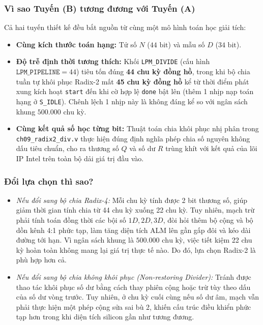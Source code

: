 \subsubsection*{Vì sao Tuyến (B) tương đương với Tuyến (A)}
Cả hai tuyến thiết kế đều bắt nguồn từ cùng một mô hình toán học giải tích:
\begin{itemize}[leftmargin=1.5em, itemsep=2pt]
    \item \textbf{Cùng kích thước toán hạng:} Tử số $N$ ($44\text{ bit}$) và mẫu số $D$ ($34\text{ bit}$).
    \item \textbf{Độ trễ định thời tương thích:} Khối \texttt{LPM\_DIVIDE} (cấu hình $\texttt{LPM\_PIPELINE} = 44$) tiêu tốn đúng \textbf{44 chu kỳ đồng hồ}, trong khi bộ chia tuần tự khôi phục Radix-2 mất \textbf{45 chu kỳ đồng hồ} kể từ thời điểm phát xung kích hoạt \texttt{start} đến khi cờ hợp lệ \texttt{done} bật lên (thêm 1 nhịp nạp toán hạng ở \texttt{S\_IDLE}). Chênh lệch 1 nhịp này là không đáng kể so với ngân sách khung $500.000\text{ chu kỳ}$.
    \item \textbf{Cùng kết quả số học từng bit:} Thuật toán chia khôi phục nhị phân trong \texttt{ch09\_radix2\_div.v} thực hiện đúng định nghĩa phép chia số nguyên không dấu tiêu chuẩn, cho ra thương số $Q$ và số dư $R$ trùng khít với kết quả của lõi IP Intel trên toàn bộ dải giá trị đầu vào.
\end{itemize}

\subsubsection*{Đổi lựa chọn thì sao?}
\begin{itemize}[leftmargin=1.5em, itemsep=2pt]
    \item \emph{Nếu đổi sang bộ chia Radix-4:} Mỗi chu kỳ tính được 2 bit thương số, giúp giảm thời gian tính chia từ 44 chu kỳ xuống 22 chu kỳ. Tuy nhiên, mạch trừ phải tính toán đồng thời các bội số $1D, 2D, 3D$, đòi hỏi thêm bộ cộng và bộ dồn kênh 4:1 phức tạp, làm tăng diện tích ALM lên gần gấp đôi và kéo dài đường tới hạn. Vì ngân sách khung là $500.000\text{ chu kỳ}$, việc tiết kiệm 22 chu kỳ hoàn toàn không mang lại giá trị thực tế nào. Do đó, lựa chọn Radix-2 là phù hợp hơn cả.
    \item \emph{Nếu đổi sang bộ chia không khôi phục (Non-restoring Divider):} Tránh được thao tác khôi phục số dư bằng cách thay phiên cộng hoặc trừ tùy theo dấu của số dư vòng trước. Tuy nhiên, ở chu kỳ cuối cùng nếu số dư âm, mạch vẫn phải thực hiện một phép cộng sửa sai bù 2, khiến cấu trúc điều khiển phức tạp hơn trong khi diện tích silicon gần như tương đương.
\end{itemize}


